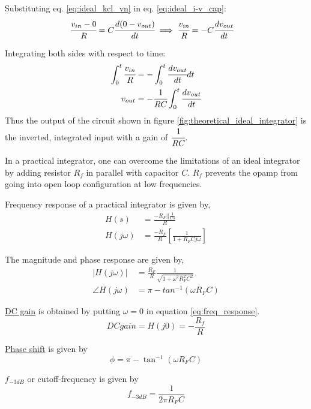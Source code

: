 \documentclass[12pt, titlepage]{article}
\theoremstyle{definition}
\begin{document}
    Substituting eq. \ref{eq:ideal_kcl_vn} in eq. \ref{eq:ideal_i-v_cap}:
    \begin{align*}
      \cfrac{v_{in} - 0}{R} &= C\cfrac{d(0 - v_{out})}{dt}
      \implies \cfrac{v_{in}}{R} = -C\cfrac{dv_{out}}{dt}
    \end{align*}

    Integrating both sides with respect to time:
    \begin{align*}
      \int_0^t {\cfrac{v_{in}}{R}} &= - \int_0^t {\cfrac{dv_{out}}{dt}dt} \\
      v_{out} &= -\cfrac{1}{RC} \int_0^t {\cfrac{dv_{out}}{dt}}
    \end{align*}
    Thus the output of the circuit shown in figure \ref{fig:theoretical_ideal_integrator} is the inverted, integrated input with a gain of $\cfrac{1}{RC}$.

    In a practical integrator, one can overcome the limitations of an ideal integrator by adding resistor $R_{f}$ in parallel with capacitor $C$.
    $R_{f}$ prevents the opamp from going into open loop configuration at low frequencies.

    Frequency response of a practical integrator is given by,
    \begin{align}\label{eq:freq_response}
      H(s) &= \frac{-R_{F} || \frac{1}{Cs}}{R} \\
      H(j\omega) &= \frac{-R_{F}}{R} \left[ \frac{1}{1+R_{F}Cj\omega} \right]
    \end{align}

    The magnitude and phase response are given by,
    \begin{align*}
    |H(j\omega)| &= \frac{R_{F}}{R}\frac{1}{\sqrt{1+\omega^{2}R_{F}^{2}C^{2}}} \\
    \angle H(j\omega) &= \pi - tan^{-1}(\omega R_{F}C)
    \end{align*}

    \underline{DC gain} is obtained by putting $\omega = 0$ in equation \ref{eq:freq_response}.
    \begin{equation}
      DC gain = H(j0) = -\frac{R_f}{R}
    \end{equation}

    \underline{Phase shift} is given by
    \begin{equation}\label{eq:phase_shift}
      \phi = \pi - \tan^{-1}(\omega R_FC)
    \end{equation}

    \underline{$f_{-3dB}$} or cutoff-frequency is given by
    \begin{equation}\label{eq:f3db}
      f_{-3dB} = \frac{1}{2\pi R_FC}
    \end{equation}
\end{document}
